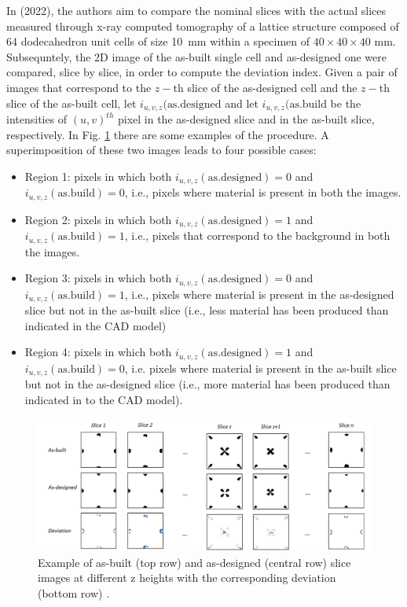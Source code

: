 In \citeauthor{colosimo_complex_2022} (2022), the authors aim to compare the nominal slices with the actual slices measured through x-ray computed tomography of a lattice structure composed of 64 dodecahedron unit cells of size \SI{10}{\milli\metre} within a specimen of $40 \times 40 \times 40$ \unit{\milli\metre}. Subsequntely, the 2D image of the as-built single cell and as-designed one were compared, slice by slice, in order to compute the deviation index. Given a pair of images that correspond to the $z-$th slice of the as-designed cell and the $z-$th slice of the as-built cell, let $i_{u,v,z}(\text{as.designed}$ and let $i_{u,v,z}(\text{as.build}$ be the intensities of $(u,v)^{th}$ pixel in the as-designed slice and in the as-built slice, respectively. In Fig. \ref{fig:slices} there are some examples of the procedure. A superimposition of these two images leads to four possible cases:
\begin{itemize}
    \item Region 1: pixels in which both $i_{u,v,z}(\text{as.designed})=0$ and $i_{u,v,z}(\text{as.build})=0$, i.e., pixels where material is present in both the images.
    \item Region 2: pixels in which both $i_{u,v,z}(\text{as.designed})=1$ and $i_{u,v,z}(\text{as.build})=1$, i.e., pixels that correspond to the background in both the images.
    \item Region 3: pixels in which both $i_{u,v,z}(\text{as.designed})=0$ and $i_{u,v,z}(\text{as.build})=1$, i.e., pixels where material is present in the as-designed slice but not in the as-built slice (i.e., less material has been produced than indicated in the CAD model)
    \item Region 4: pixels in which both $i_{u,v,z}(\text{as.designed})=1$ and $i_{u,v,z}(\text{as.build})=0$, i.e. pixels where material is present in the as-built slice but not in the as-designed slice (i.e., more material has been produced than indicated in to the CAD model).
\end{itemize}


\begin{figure}
    \centering
    \includegraphics[scale=0.5]{Images/slicescolosimo.png}
    \caption[Deviation index.]{Example of as-built (top row) and as-designed (central row) slice images at different z heights with the corresponding deviation (bottom row) \cite{colosimo_complex_2022}. }
    \label{fig:slices}
\end{figure}


